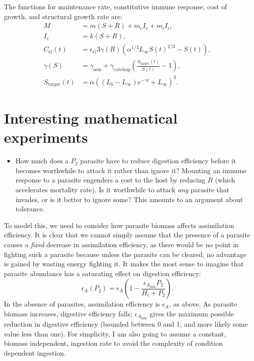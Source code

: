 \documentclass[11pt,reqno,final,pdftex]{amsart}\usepackage[]{graphicx}\usepackage[]{color}
\theoremstyle{plain}
\numberwithin{equation}{part}
\begin{document}
The functions for maintenance rate, constitutive immune response, cost of growth, and structural growth rate are:
\begin{align}
M &= m(S+R)+m_cI_c+m_iI_i, \\
I_c &= k(S + R), \\
C_G(t)&=\epsilon_G 3\gamma(R) \left(\alpha^{1/3}L_{\infty }S(t)^{2/3}-S(t)\right), \\
\gamma(S) &=\gamma _{\min}+\gamma_{\text{catchup}}\left(\frac{S_{\text{target}}(t)}{S(t)}-1\right), \\
S_{\text{target}}(t) &= \alpha \left(\left(L_b-L_{\infty }\right) e^{-\gamma  t}+L_{\infty }\right)^3.
\end{align}




\section*{Interesting mathematical experiments}
\begin{itemize}
\item How much does a $P_2$ parasite have to reduce digestion efficiency before it becomes worthwhile to attack it rather than ignore it? Mounting an immune response to a parasite engenders a cost to the host by reducing $R$ (which accelerates mortality rate). Is it worthwhile to attack \emph{any} parasite that invades, or is it better to ignore some? This amounts to an argument about tolerance.
\end{itemize}

To model this, we need to consider how parasite biomass affects assimilation efficiency.
It is clear that we cannot simply assume that the presence of a parasite causes a \emph{fixed} decrease in assimilation efficiency, as there would be no point in fighting such a parasite because unless the parasite can be cleared, no advantage is gained by wasting energy fighting it.
It makes the most sense to imagine that parasite abundance has a saturating effect on digestion efficiency:
\begin{equation}
\epsilon_A(P_2) = \epsilon_A\left(1 - \frac{\epsilon_{A_{\min}} P_2}{H_\epsilon + P_2}\right).
\end{equation}
In the absence of parasites, assimilation efficiency is $\epsilon_A$, as above.
As parasite biomass increases, digestive efficiency falls; $\epsilon_{A_{\min}}$ gives the maximum possible reduction in digestive efficiency (bounded between 0 and 1, and more likely some value less than one).
For simplicity, I am also going to assume a constant, biomass independent, ingestion rate to avoid the complexity of condition dependent ingestion.
\end{document}
